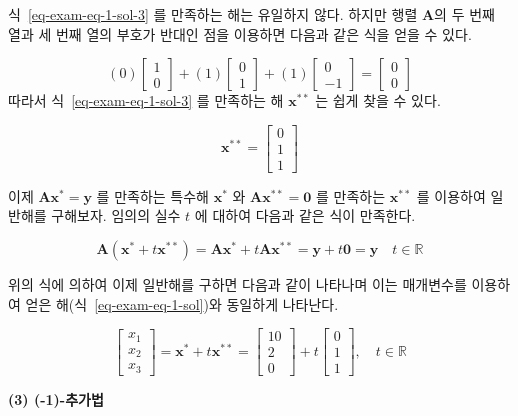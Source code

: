 \documentclass[
  11pt,
  a4paper,
  oneside]{scrbook}
\newcommand{\RR}{\mathbb{R}}
\theoremstyle{definition}
\theoremstyle{definition}
\theoremstyle{plain}
\theoremstyle{remark}
\begin{document}
식~\ref{eq-exam-eq-1-sol-3} 를 만족하는 해는 유일하지 않다. 하지만 행렬
\(\pmb A\)의 두 번째 열과 세 번째 열의 부호가 반대인 점을 이용하면
다음과 같은 식을 얻을 수 있다.

\[
(0)
\begin{bmatrix}
1  \\
0  
\end{bmatrix}
+
(1)
\begin{bmatrix}
 0  \\
 1   
\end{bmatrix}
+ (1)
\begin{bmatrix}
 0 \\
-1 
\end{bmatrix}
=
\begin{bmatrix}
0 \\
0
\end{bmatrix}
\] 따라서 식~\ref{eq-exam-eq-1-sol-3} 를 만족하는 해 \(\pmb x^{**}\) 는
쉽게 찾을 수 있다.

\[ \pmb x^{**} =
\begin{bmatrix}
0 \\
1 \\
1 
\end{bmatrix}
\]

이제 \(\pmb A \pmb x^{*} = \pmb y\) 를 만족하는 특수해 \(\pmb x^{*}\) 와
\(\pmb A \pmb x^{**} = \pmb 0\) 를 만족하는 \(\pmb x^{**}\) 를 이용하여
일반해를 구해보자. 임의의 실수 \(t\) 에 대하여 다음과 같은 식이
만족한다.

\[ \pmb A (\pmb x^* + t \pmb x^{**})  =
\pmb A \pmb x^* + t \pmb A \pmb x^{**}
= \pmb y + t \pmb 0 = \pmb y \quad  t \in \RR\]

위의 식에 의하여 이제 일반해를 구하면 다음과 같이 나타나며 이는
매개변수를 이용하여 얻은 해(식~\ref{eq-exam-eq-1-sol})와 동일하게
나타난다.

\[
\begin{bmatrix}
x_1 \\
x_2 \\
x_3 
\end{bmatrix}
= 
\pmb x^* + t \pmb x^{**}
=
\begin{bmatrix}
10 \\
2 \\
0 
\end{bmatrix}+
t
\begin{bmatrix}
0 \\
1 \\
1 
\end{bmatrix},
 \quad t \in \RR
\]

\textbf{(3) (-1)-추가법}
\end{document}
